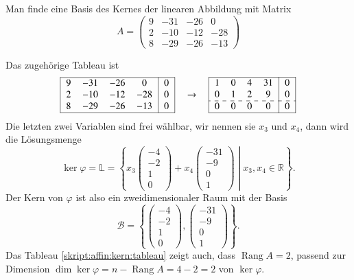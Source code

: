 \begin{beispiel}
Man finde eine Basis des Kernes der linearen Abbildung mit Matrix
\[
A=\begin{pmatrix}
    9& -31& -26&   0\\
    2& -10& -12& -28\\
    8& -29& -26& -13
\end{pmatrix}
\]
\smallskip

{\parindent0pt Das} zugehörige Tableau ist
\begin{equation}
\begin{tabular}{|>{$}c<{$}>{$}c<{$}>{$}c<{$}>{$}c<{$}|>{$}c<{$}|}
\hline
    9& -31& -26&   0&0\\
    2& -10& -12& -28&0\\
    8& -29& -26& -13&0\\
\hline
\end{tabular}
\quad\rightarrow\quad
\begin{tabular}{|>{$}c<{$}>{$}c<{$}>{$}c<{$}>{$}c<{$}|>{$}c<{$}|}
\hline
    1&   0&   4&  31&0\\
    0&   1&   2&   9&0\\
\hdashline
    0&   0&   0&   0&0\\
\hline
\end{tabular}
\label{skript:affin:kern:tableau}
\end{equation}
Die letzten zwei Variablen sind frei wählbar, wir nennen sie $x_3$ und $x_4$,
dann wird die Lösungsmenge
\[
\ker\varphi
=
\mathbb L
=
\left\{
\left.
x_3
\begin{pmatrix}
-4\\-2\\1\\0
\end{pmatrix}
+
x_4
\begin{pmatrix}
-31\\-9\\0\\1
\end{pmatrix}
\;
\right|
\;
x_3,x_4\in\mathbb R
\right\}.
\]
Der Kern von $\varphi$ ist also ein zweidimensionaler Raum mit der Basis
\[
\mathcal{B} = \left\{
\begin{pmatrix}
-4\\-2\\1\\0
\end{pmatrix},
\begin{pmatrix}
-31\\-9\\0\\1
\end{pmatrix}
\right\}.
\]
Das Tableau \eqref{skript:affin:kern:tableau} zeigt auch, dass
$\operatorname{Rang}A=2$,
passend zur Dimension $\dim\ker\varphi = n - \operatorname{Rang}A = 4-2=2$ von
$\ker\varphi$.
\end{beispiel}





